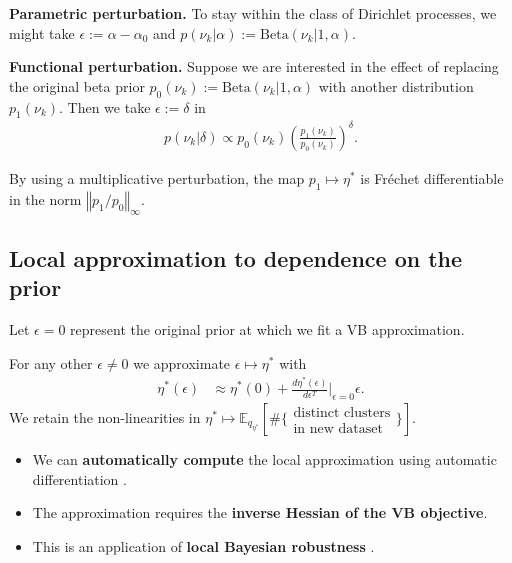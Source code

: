 \documentclass[a0,plainsections,30pt]{sciposter}\usepackage[]{graphicx}\usepackage[]{color}
\newcommand{\Expect}{\mathbb{E}}
\newcommand{\etaopt}{\eta^{*}}
\newcommand{\targetexpectation}{\Expect_{q_{\eta^*}}
\left[\#\{\substack{\text{distinct clusters}\\\text{in new dataset}}\} \right]}
\begin{document}
\begin{minipage}[t]{0.45\textwidth}
\textbf{Parametric perturbation.} To stay within the class of Dirichlet
processes, we might take $\epsilon := \alpha - \alpha_0$ and $p(\nu_k | \alpha) :=
\mathrm{Beta}(\nu_k | 1, \alpha)$.

\textbf{Functional perturbation.} Suppose we are interested in the effect of
replacing the original beta prior $p_0(\nu_k) := \mathrm{Beta}(\nu_k | 1,
\alpha)$ with another distribution $p_1(\nu_k)$. Then we take $\epsilon :=
\delta$ in
%
\vspace{-0.3in}
\begin{align*}
p(\nu_k \vert \delta) \propto
    p_{0}(\nu_k)\left(\frac{p_1(\nu_k)}{p_0(\nu_k)}\right)^\delta.
\end{align*}
\vspace{-0.3in}

By using a multiplicative perturbation, the map $p_1 \mapsto \etaopt$ is
Fr\'{e}chet differentiable in the norm $\left\Vert p_1 / p_0
\right\Vert_\infty$.

\vspace{-0.3in}
\subsection*{Local approximation to dependence on the prior}
\vspace{-0.2in}
Let $\epsilon=0$ represent the original prior at which we fit a VB
approximation.

\begin{mdframed}[style=MyFrame]
For any other $\epsilon \ne 0$ we approximate $\epsilon \mapsto \etaopt$ with
\begin{align*}
\eta^*(\epsilon)  &\approx  \eta^*(0) +
\frac{d \eta^*(\epsilon)}{d\epsilon^T}\Big|_{\epsilon=0} \epsilon.
\end{align*}
We retain the non-linearities in $\etaopt \mapsto \targetexpectation$.
\end{mdframed}

\begin{itemize}
\item We can \textbf{automatically compute}
    the local approximation
    using automatic differentiation \cite{giordano:2017:covariances}.
\item The approximation requires the
    \textbf{inverse Hessian of the VB objective}.
\item This is an application of \textbf{local Bayesian robustness}
\citep{gustafson:1996:localposterior}.
\end{itemize}

\end{minipage}
\end{document}
